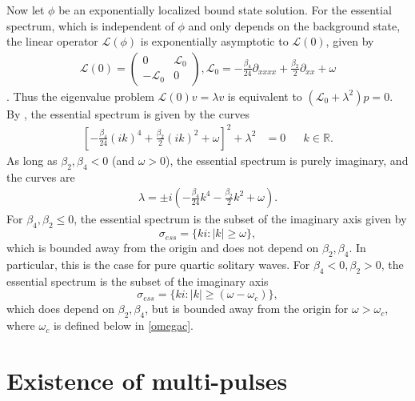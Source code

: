 \documentclass[12pt]{article}
\def\R{{\mathbb R}}
\def\calL{{\mathcal L}}
\begin{document}
Now let $\phi$ be an exponentially localized bound state solution. For the essential spectrum, which is independent of $\phi$ and only depends on the background state, the linear operator $\calL(\phi)$ is exponentially asymptotic to $\calL(0)$, given by
\begin{align}\label{defL0}
\calL(0) = 
\begin{pmatrix}
0 & \calL_0 \\
-\calL_0 & 0
\end{pmatrix},
\calL_0 = -\frac{\beta_4}{24} \partial_{xxxx} + \frac{\beta_2}{2} \partial_{xx} + \omega
\end{align}.
Thus the eigenvalue problem $\calL(0) v = \lambda v$ is equivalent to $(\calL_0 + \lambda^2)p = 0$. By \cite[Theorem 3.1.13]{Kapitula2013}, the essential spectrum is given by the curves
\begin{align*}
\left[ -\frac{\beta_4}{24} (ik)^4 + \frac{\beta_2}{2}(ik)^2 + \omega \right]^2 + \lambda^2 &= 0 && k \in \R.
\end{align*}
As long as $\beta_2, \beta_4 < 0$ (and $\omega > 0$), the essential spectrum is purely imaginary, and the curves are
\begin{align*}
\lambda = \pm i \left( -\frac{\beta_4}{24}k^4 - \frac{\beta_2}{2}k^2 + \omega \right).
\end{align*}
For $\beta_4, \beta_2 \leq 0$, the essential spectrum is the subset of the imaginary axis given by
\begin{equation}\label{PQSessspec}
\sigma_{ess} = \{ k i : |k| \geq \omega \},
\end{equation}
which is bounded away from the origin and does not depend on $\beta_2,\beta_4$. In particular, this is the case for pure quartic solitary waves. For $\beta_4 < 0, \beta_2 > 0$, the essential spectrum is the subset of the imaginary axis 
\begin{equation}
\sigma_{ess} = \{ k i : |k| \geq (\omega - \omega_c) \},
\end{equation}
which does depend on $\beta_2,\beta_4$, but is bounded away from the origin for $\omega > \omega_c$, where $\omega_c$ is defined below in \cref{omegac}.

\section{Existence of multi-pulses}
\end{document}
